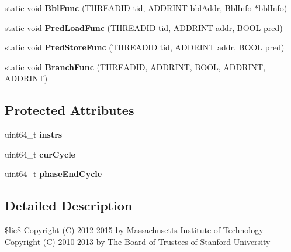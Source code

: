 \begin{DoxyCompactItemize}
\item 
\hypertarget{classNullCore_a8b9e2effc6d6988d108dca3e49143b13}{static void {\bfseries Bbl\-Func} (T\-H\-R\-E\-A\-D\-I\-D tid, A\-D\-D\-R\-I\-N\-T bbl\-Addr, \hyperlink{structBblInfo}{Bbl\-Info} $\ast$bbl\-Info)}\label{classNullCore_a8b9e2effc6d6988d108dca3e49143b13}

\item 
\hypertarget{classNullCore_a337e44b515ab6af2afa2000196404faa}{static void {\bfseries Pred\-Load\-Func} (T\-H\-R\-E\-A\-D\-I\-D tid, A\-D\-D\-R\-I\-N\-T addr, B\-O\-O\-L pred)}\label{classNullCore_a337e44b515ab6af2afa2000196404faa}

\item 
\hypertarget{classNullCore_a33ba5710fb8d65709c9bfc7cfa0bdade}{static void {\bfseries Pred\-Store\-Func} (T\-H\-R\-E\-A\-D\-I\-D tid, A\-D\-D\-R\-I\-N\-T addr, B\-O\-O\-L pred)}\label{classNullCore_a33ba5710fb8d65709c9bfc7cfa0bdade}

\item 
\hypertarget{classNullCore_ab2805cc932388c43a83d55556742b829}{static void {\bfseries Branch\-Func} (T\-H\-R\-E\-A\-D\-I\-D, A\-D\-D\-R\-I\-N\-T, B\-O\-O\-L, A\-D\-D\-R\-I\-N\-T, A\-D\-D\-R\-I\-N\-T)}\label{classNullCore_ab2805cc932388c43a83d55556742b829}

\end{DoxyCompactItemize}
\subsection*{Protected Attributes}
\begin{DoxyCompactItemize}
\item 
\hypertarget{classNullCore_a546157d127fa2a570166854d5c7cc065}{uint64\-\_\-t {\bfseries instrs}}\label{classNullCore_a546157d127fa2a570166854d5c7cc065}

\item 
\hypertarget{classNullCore_a3974cccfba88af1227f7915d251763ad}{uint64\-\_\-t {\bfseries cur\-Cycle}}\label{classNullCore_a3974cccfba88af1227f7915d251763ad}

\item 
\hypertarget{classNullCore_adb6af023ef40930dd8e3d0dd81ffcf09}{uint64\-\_\-t {\bfseries phase\-End\-Cycle}}\label{classNullCore_adb6af023ef40930dd8e3d0dd81ffcf09}

\end{DoxyCompactItemize}


\subsection{Detailed Description}
\$lic\$ Copyright (C) 2012-\/2015 by Massachusetts Institute of Technology Copyright (C) 2010-\/2013 by The Board of Trustees of Stanford University

